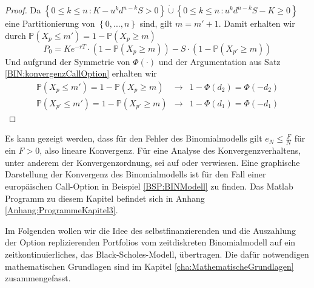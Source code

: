 \begin{proof}
Da $\left\{0 \leq k \leq n \, \colon K - u^kd^{n-k}S > 0 \right\} \dot\cup \left\{0 \leq k \leq n \, \colon u^kd^{n-k}S - K \geq 0 \right\}$ eine Partitionierung von $\left\{0,...,n\right\}$ sind, gilt $m = m' + 1$. Damit erhalten wir durch $\mathbb{P} \left( X_p \leq m'\right) = 1 - \mathbb{P}\left(X_p \geq m\right)$
\begin{equation*}
P_0 = Ke^{-rT} \cdot \left( 1 - \mathbb{P}\left(X_{p} \geq m\right)\right)  - S \cdot \left( 1 - \mathbb{P}\left(X_{p'} \geq m\right)\right) \label{BIN:putoption}
\end{equation*}
Und aufgrund der Symmetrie von $\Phi(\cdot)$ und der Argumentation aus Satz \ref{BIN:konvergenzCallOption} erhalten wir
\begin{eqnarray*}
\mathbb{P}\left(X_{p} \leq m'\right) = 1 - \mathbb{P}\left(X_{p} \geq m\right) & \to & 1 - \Phi\left(d_2\right) = \Phi\left(-d_2\right) \\
\mathbb{P}\left(X_{p'} \leq m'\right) = 1 - \mathbb{P}\left(X_{p'} \geq m\right)& \to & 1 - \Phi\left(d_1\right) = \Phi\left(-d_1\right)
\end{eqnarray*}
\end{proof}



Es kann gezeigt werden, dass für den Fehler des Binomialmodells gilt $e_N\leq\frac{F}{N}$ für ein $F>0$, also lineare Konvergenz. Für eine Analyse des Konvergenzverhaltens, unter anderem der Konvergenzordnung, sei auf \cite{LeisenReimer} oder \cite{Walsh} verwiesen. Eine graphische Darstellung der Konvergenz des Binomialmodells ist für den Fall einer europäischen Call-Option in Beispiel \ref{BSP:BINModell} zu finden. Das Matlab Programm zu diesem Kapitel befindet sich in Anhang \ref{Anhang:ProgrammeKapitel3}.

Im Folgenden wollen wir die Idee des selbstfinanzierenden und die Auszahlung der Option replizierenden Portfolios vom zeitdiskreten Binomialmodell auf ein zeitkontinuierliches, das Black-Scholes-Modell, übertragen. Die dafür notwendigen mathematischen Grundlagen sind im Kapitel \ref{cha:MathematischeGrundlagen} zusammengefasst.